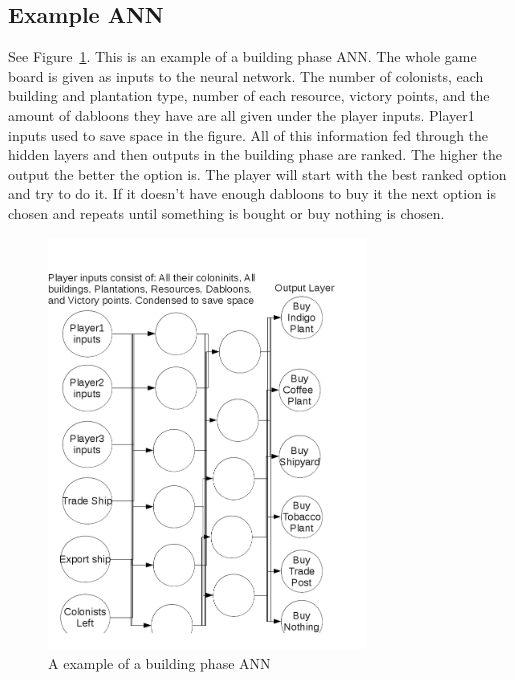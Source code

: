 \subsection{Example ANN}
See Figure~\ref{ANN Example}.  This is an example of a building phase ANN. The whole game board is given as inputs to the neural network. The number of colonists, each building and plantation type, number of each resource, victory points, and the amount of dabloons they have are all given under the player inputs. Player1 inputs used to save space in the figure. All of this information fed through the hidden layers and then outputs in the building phase are ranked. The higher the output the better the option is. The player will start with the best ranked option and try to do it. If it doesn't have enough dabloons to buy it the next option is chosen and repeats until something is bought or buy nothing is chosen.
\begin{figure}[tbh]
\begin{center}
\includegraphics[width=0.75\textwidth]{./images/Example_ANN.png}
\end{center}
\caption{A example of a building phase ANN \label{ANN Example}}
\end{figure}
